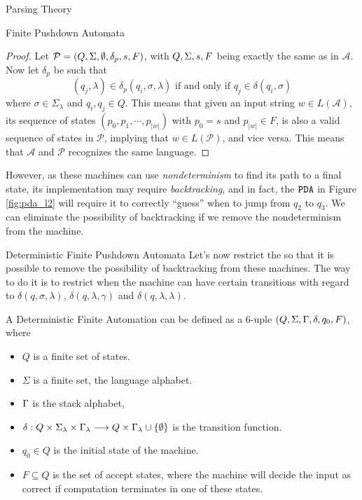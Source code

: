\begin{section}{Parsing Theory}
\begin{subsection}{Finite Pushdown Automata}
\begin{proof}
Let $\mathcal{P} = (Q, \Sigma, \emptyset, \delta_p, s, F)$, with $Q, \Sigma, s, F$ being
exactly the same as in $\mathcal{A}$. Now let $\delta_p$ be such that
$$(q_j, \lambda) \in \delta_p(q_i, \sigma, \lambda) \text{ if and only if } q_j \in \delta(q_i, \sigma)$$
where $\sigma \in \Sigma_\lambda$ and $q_i, q_j \in Q$. This means that given an
input string $w \in L(\mathcal{A})$, its sequence of states $(p_0, p_1, \cdots, p_{|w|})$
with $p_0 = s$ and $p_{|w|} \in F$, is also a valid sequence of states in $\mathcal{P}$,
implying that $w \in L(\mathcal{P})$, and vice versa. This means that $\mathcal{A}$ and
$\mathcal{P}$ recognizes the same language.
\end{proof}

However, as these machines can use \textit{nondeterminism} to find its path
to a final state, its implementation may require \textit{backtracking},
and in fact, the $\texttt{PDA}$ in Figure \ref{fig:pda_l2} will require it to correctly
``guess'' when to jump from $q_2$ to $q_3$. We can eliminate the possibility
of backtracking if we remove the nondeterminism from the machine.

\end{subsection}

\begin{subsection}{Deterministic Finite Pushdown Automata}
	Let's now restrict the  so that
it is possible to remove the possibility of backtracking from these machines.
The way to do it is to restrict when the machine can have certain transitions
with regard to $\delta(q, \sigma, \lambda)$, $\delta(q, \lambda, \gamma)$ and
$\delta(q, \lambda, \lambda)$.

\begin{definition}
A Deterministic Finite Automation  can be defined as a 6-uple
$(Q, \Sigma, \Gamma, \delta, q_0, F)$, where
\begin{itemize}

\item $Q$ is a finite set of states.
\item $\Sigma$ is a finite set, the language alphabet.
\item $\Gamma$ is the stack alphabet,
\item $\delta:Q\times\Sigma_\lambda \times \Gamma_\lambda \longrightarrow Q \times \Gamma_\lambda \cup \{\emptyset \}$ is the transition function.
\item $q_0 \in Q$ is the initial state of the machine.
\item $F \subseteq Q$ is the set of accept states, where the machine will
decide the input as correct if computation terminates in one of these
states.
\end{itemize}


\end{definition}
\end{subsection}
\end{section}
